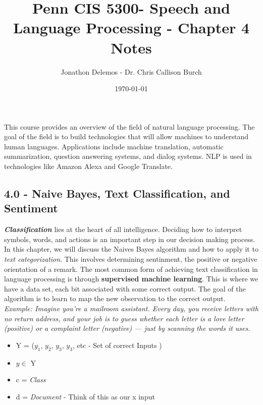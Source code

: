 \documentclass{article}
\title{Penn CIS 5300- Speech and Language Processing - Chapter 4 Notes}
\author{Jonathon Delemos - Dr. Chris Callison Burch}
\date{\today}
\begin{document}
\maketitle

This course provides an overview of the field of natural language processing. The goal of
the field is to build technologies that will allow machines to understand human languages.
Applications include machine translation, automatic summarization, question answering
systems, and dialog systems. NLP is used in technologies like Amazon Alexa and Google
Translate.

\subsection{4.0 - Naive Bayes, Text Classification, and Sentiment}
\textbf{\textit{Classification}} lies at the heart of all intelligence. Deciding how to interpret symbols, words, and actions is an important step in our decision making process.
In this chapter, we will discuss the Naives Bayes algorithm and how to apply it to \textit{text categorization}.
This involves determining sentinment, the positive or negative orientation of a remark.
The most common form of achieving text classification in language processing is through \textbf{supervised machine learning}.
This is where we have a data set, each bit associated with some correct output. The goal of the algorithm is to learn to map
the new observation to the correct output. \newline
\\ \textit{Example: Imagine you're a mailroom assistant. Every day, you receive letters with no return address, and your job is to guess whether each letter is a love letter (positive) or a complaint letter (negative) — just by scanning the words it uses.}

\begin{itemize}
    \item Y = ($y_1$, $y_2$, $y_3$, $y_3$, etc - Set of correct Inputs )
    \item $y \in $ Y
    \item c = \textit{Class}
    \item d = \textit{Document} - Think of this as our x input
\end{itemize}
\end{document}
